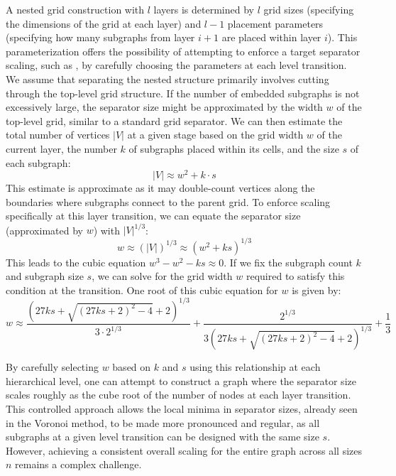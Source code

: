 A nested grid construction with \(l\) layers is determined by \(l\) grid sizes (specifying the dimensions of the grid at each layer) and \(l-1\) placement parameters (specifying how many subgraphs from layer \(i+1\) are placed within layer \(i\)).
This parameterization offers the possibility of attempting to enforce a target separator scaling, such as , by carefully choosing the parameters at each level transition.
We assume that separating the nested structure primarily involves cutting through the top-level grid structure.
If the number of embedded subgraphs is not excessively large, the separator size might be approximated by the width \(w\) of the top-level grid, similar to a standard grid separator.
We can then estimate the total number of vertices \(|V|\) at a given stage based on the grid width \(w\) of the current layer, the number \(k\) of subgraphs placed within its cells, and the size \(s\) of each subgraph:
\[ |V| \approx w^2 + k \cdot s \]
This estimate is approximate as it may double-count vertices along the boundaries where subgraphs connect to the parent grid.
To enforce  scaling specifically at this layer transition, we can equate the separator size (approximated by \(w\)) with \(|V|^{1/3}\):
\[ w \approx (|V|)^{1/3} \approx (w^2 + ks)^{1/3} \]
This leads to the cubic equation \( w^3 - w^2 - ks \approx 0 \).
If we fix the subgraph count \(k\) and subgraph size \(s\), we can solve for the grid width \(w\) required to satisfy this condition at the transition.
One root of this cubic equation for \(w\) is given by:
\[ w \approx \frac{(27 k s + \sqrt{(27 k s + 2)^2 - 4} + 2)^{1/3}}{3 \cdot 2^{1/3}} + \frac{2^{1/3}}{3 (27 k s + \sqrt{(27 k s + 2)^2 - 4} + 2)^{1/3}} + \frac{1}{3} \]

By carefully selecting \(w\) based on \(k\) and \(s\) using this relationship at each hierarchical level, one can attempt to construct a graph where the separator size scales roughly as the cube root of the number of nodes at each layer transition.
This controlled approach allows the local minima in separator sizes, already seen in the Voronoi method, to be made more pronounced and regular, as all subgraphs at a given level transition can be designed with the same size \(s\).
However, achieving a consistent overall  scaling for the entire graph across all sizes \(n\) remains a complex challenge.
